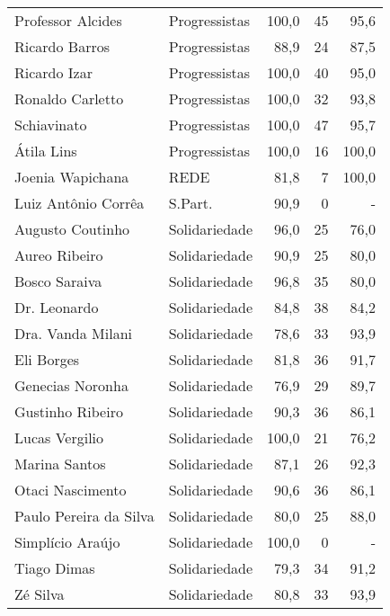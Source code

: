 \begin{longtable}{llrrr}
                   Professor Alcides &  Progressistas &     100,0 &           45 &       95,6 \\
                      Ricardo Barros &  Progressistas &      88,9 &           24 &       87,5 \\
                        Ricardo Izar &  Progressistas &     100,0 &           40 &       95,0 \\
                    Ronaldo Carletto &  Progressistas &     100,0 &           32 &       93,8 \\
                         Schiavinato &  Progressistas &     100,0 &           47 &       95,7 \\
                          Átila Lins &  Progressistas &     100,0 &           16 &      100,0 \\
                    Joenia Wapichana &           REDE &      81,8 &            7 &      100,0 \\
                 Luiz Antônio Corrêa &        S.Part. &      90,9 &            0 &          - \\
                    Augusto Coutinho &  Solidariedade &      96,0 &           25 &       76,0 \\
                       Aureo Ribeiro &  Solidariedade &      90,9 &           25 &       80,0 \\
                       Bosco Saraiva &  Solidariedade &      96,8 &           35 &       80,0 \\
                        Dr. Leonardo &  Solidariedade &      84,8 &           38 &       84,2 \\
                   Dra. Vanda Milani &  Solidariedade &      78,6 &           33 &       93,9 \\
                          Eli Borges &  Solidariedade &      81,8 &           36 &       91,7 \\
                    Genecias Noronha &  Solidariedade &      76,9 &           29 &       89,7 \\
                    Gustinho Ribeiro &  Solidariedade &      90,3 &           36 &       86,1 \\
                      Lucas Vergilio &  Solidariedade &     100,0 &           21 &       76,2 \\
                       Marina Santos &  Solidariedade &      87,1 &           26 &       92,3 \\
                    Otaci Nascimento &  Solidariedade &      90,6 &           36 &       86,1 \\
              Paulo Pereira da Silva &  Solidariedade &      80,0 &           25 &       88,0 \\
                    Simplício Araújo &  Solidariedade &     100,0 &            0 &          - \\
                         Tiago Dimas &  Solidariedade &      79,3 &           34 &       91,2 \\
                            Zé Silva &  Solidariedade &      80,8 &           33 &       93,9 \\
\end{longtable}

